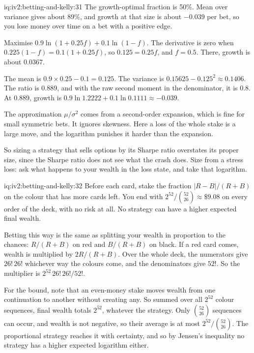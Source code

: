 \begin{solution}{iq:iv2:betting-and-kelly:31}
The growth-optimal fraction is 50\%. Mean over variance gives about 89\%, and growth at that size is about $-0.039$ per bet, so you lose money over time on a bet with a positive edge.

Maximise $0.9\ln(1 + 0.25f) + 0.1\ln(1 - f)$. The derivative is zero when $0.225(1 - f) = 0.1(1 + 0.25f)$, so $0.125 = 0.25f$, and $f = 0.5$. There, growth is about 0.0367.

The mean is $0.9 \times 0.25 - 0.1 = 0.125$. The variance is $0.15625 - 0.125^2 \approx 0.1406$. The ratio is 0.889, and with the raw second moment in the denominator, it is 0.8. At 0.889, growth is $0.9\ln 1.2222 + 0.1\ln 0.1111 \approx -0.039$.

The approximation $\mu/\sigma^2$ comes from a second-order expansion, which is fine for small symmetric bets. It ignores skewness. Here a loss of the whole stake is a large move, and the logarithm punishes it harder than the expansion.

So sizing a strategy that sells options by its Sharpe ratio overstates its proper size, since the Sharpe ratio does not see what the crash does. Size from a stress loss: ask what happens to your wealth in the loss state, and take that logarithm.

\end{solution}

\begin{solution}{iq:iv2:betting-and-kelly:32}
Before each card, stake the fraction $|R - B|/(R + B)$ on the colour that has more cards left. You end with $2^{52}/\binom{52}{26} \approx \$9.08$ on every order of the deck, with no risk at all. No strategy can have a higher expected final wealth.

Betting this way is the same as splitting your wealth in proportion to the chances: $R/(R + B)$ on red and $B/(R + B)$ on black. If a red card comes, wealth is multiplied by $2R/(R + B)$. Over the whole deck, the numerators give $26!\,26!$ whichever way the colours come, and the denominators give $52!$. So the multiplier is $2^{52}\,26!\,26!/52!$.

For the bound, note that an even-money stake moves wealth from one continuation to another without creating any. So summed over all $2^{52}$ colour sequences, final wealth totals $2^{52}$, whatever the strategy. Only $\binom{52}{26}$ sequences can occur, and wealth is not negative, so their average is at most $2^{52}/\binom{52}{26}$. The proportional strategy reaches it with certainty, and so by Jensen's inequality no strategy has a higher expected logarithm either.

\end{solution}

